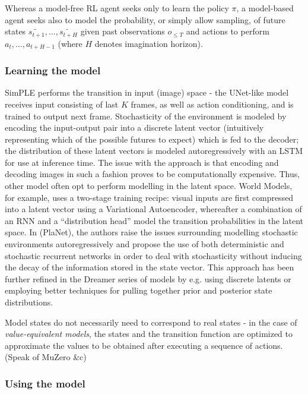 \documentclass[twoside,11pt]{article}
\begin{document}
Whereas a model-free RL agent seeks only to learn the policy $\pi$, a model-based agent seeks also to model the probability, or simply allow sampling, of future states $\widetilde{s_{t+1}}, \ldots, \widetilde{s_{t+H}}$ given past observations $o_{\leq T}$ and actions to perform $a_{t}, \ldots, a_{t+H-1}$ (where $H$ denotes imagination horizon).

\subsubsection{Learning the model}

SimPLE performs the transition in input (image) space - the UNet-like model receives input consisting of last $K$ frames, as well as action conditioning, and is trained to output next frame. Stochasticity of the environment is modeled by encoding the input-output pair into a discrete latent vector (intuitively representing which of the possible futures to expect) which is fed to the decoder; the distribution of these latent vectors is modeled autoregressively with an LSTM for use at inference time. The issue with the approach is that encoding and decoding images in such a fashion proves to be computationally expensive. Thus, other model often opt to perform modelling in the latent space. World Models, for example, uses a two-stage training recipe: visual inputs are first compressed into a latent vector using a Variational Autoencoder, whereafter a combination of an RNN and a ``distribution head'' model the transition probabilities in the latent space. In (PlaNet), the authors raise the issues surrounding modelling stochastic environments autoregressively and propose the use of both deterministic and stochastic recurrent networks in order to deal with stochasticity without inducing the decay of the information stored in the state vector. This approach has been further refined in the Dreamer series of models by e.g. using discrete latents or employing better techniques for pulling together prior and posterior state distributions.

Model states do not necessarily need to correspond to real states - in the case of \emph{value-equivalent models}, the states and the transition function are optimized to approximate the values to be obtained after executing a sequence of actions. (Speak of MuZero \&c)

\subsubsection{Using the model}
\end{document}
